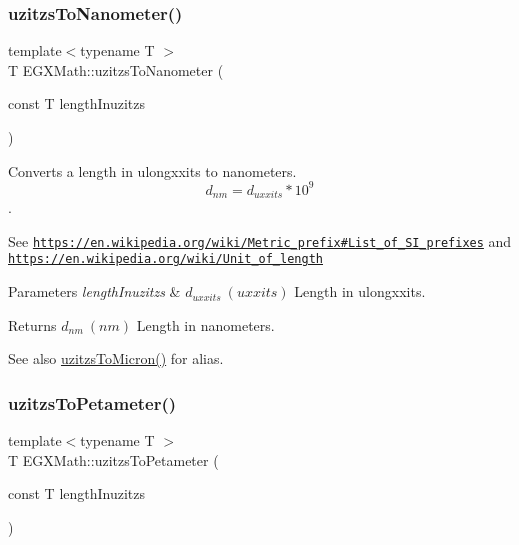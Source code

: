 \subsubsection{\texorpdfstring{uzitzs\+To\+Nanometer()}{uzitzsToNanometer()}}
{\footnotesize\ttfamily template$<$typename T $>$ \\
T E\+G\+X\+Math\+::uzitzs\+To\+Nanometer (\begin{DoxyParamCaption}\item[{const T}]{length\+Inuzitzs }\end{DoxyParamCaption})}



Converts a length in ulongxxits to nanometers. \[ d_{nm}=d_{uxxits} * 10^{9} \]. 

See \href{https://en.wikipedia.org/wiki/Metric_prefix#List_of_SI_prefixes}{\tt https\+://en.\+wikipedia.\+org/wiki/\+Metric\+\_\+prefix\#\+List\+\_\+of\+\_\+\+S\+I\+\_\+prefixes} and \href{https://en.wikipedia.org/wiki/Unit_of_length}{\tt https\+://en.\+wikipedia.\+org/wiki/\+Unit\+\_\+of\+\_\+length} 
\begin{DoxyParams}{Parameters}
{\em length\+Inuzitzs} & $ d_{uxxits}\ (uxxits)$ Length in ulongxxits. \\
\hline
\end{DoxyParams}
\begin{DoxyReturn}{Returns}
$ d_{nm}\ (nm)$ Length in nanometers. 
\end{DoxyReturn}
\begin{DoxySeeAlso}{See also}
\mbox{\hyperlink{group___e_g_x_math-_conversions-_length_conversions-uzitzs-_non-_s_i_ga695a8fd8870537930d6378e99ad2aa9f}{uzitzs\+To\+Micron()}} for alias. 
\end{DoxySeeAlso}
\mbox{\label{group___e_g_x_math-_conversions-_length_conversions-uzitzs-_s_i_gafe93d0226789fd78c2ffa4223eb6af7b}} 
\subsubsection{\texorpdfstring{uzitzs\+To\+Petameter()}{uzitzsToPetameter()}}
{\footnotesize\ttfamily template$<$typename T $>$ \\
T E\+G\+X\+Math\+::uzitzs\+To\+Petameter (\begin{DoxyParamCaption}\item[{const T}]{length\+Inuzitzs }\end{DoxyParamCaption})}



